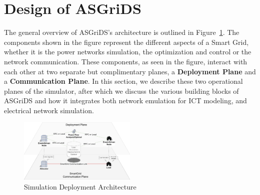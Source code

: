 \documentclass[conference]{IEEEtran}
\begin{document}

\section{Design of ASGriDS}\label{design}

The general overview of ASGriDS's architecture is outlined in Figure~\ref{sens_arch}. The components shown in the figure represent the different aspects of a Smart Grid, whether it is the power networks simulation, the optimization and control or the network communication. These components, as seen in the figure, interact with each other at two separate but complimentary planes, a \textbf{Deployment Plane} and a \textbf{Communication Plane}.
In this section, we describe these two operational planes of the simulator, after which we discuss the various building blocks of ASGriDS and how it integrates both network emulation for ICT modeling, and electrical network simulation.

\begin{figure}[htp]
	\centering%
	\includegraphics[width=0.5\textwidth]{sens_arch.png}%
	\caption{Simulation Deployment Architecture}%
	\label{sens_arch}%
\end{figure}
\end{document}
